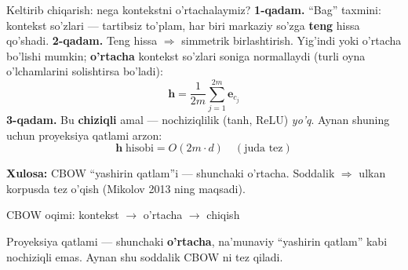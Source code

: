 \documentclass[aspectratio=169,11pt]{beamer}
\begin{document}
\begin{frame}{Keltirib chiqarish: nega kontekstni o'rtachalaymiz?}
  \textbf{1-qadam.} ``Bag'' taxmini: kontekst so'zlari --- tartibsiz to'plam,
  har biri markaziy so'zga \textbf{teng} hissa qo'shadi.
  \pause
  \textbf{2-qadam.} Teng hissa $\Rightarrow$ simmetrik birlashtirish. Yig'indi
  yoki o'rtacha bo'lishi mumkin; \textbf{o'rtacha} kontekst so'zlari soniga
  normallaydi (turli oyna o'lchamlarini solishtirsa bo'ladi):
  $$ \mathbf{h} = \frac{1}{2m}\sum_{j=1}^{2m} \mathbf{e}_{c_j} $$
  \pause
  \textbf{3-qadam.} Bu \textbf{chiziqli} amal --- nochiziqlilik (tanh,
  ReLU) \emph{yo'q}. Aynan shuning uchun proyeksiya qatlami arzon:
  $$ \mathbf{h} \;\text{hisobi} = O(2m\cdot d) \quad(\text{juda tez}) $$
  \begin{tcolorbox}[okbox,top=2pt,bottom=2pt]
    \small \textbf{Xulosa:} CBOW ``yashirin qatlam''i --- shunchaki o'rtacha.
    Soddalik $\Rightarrow$ ulkan korpusda tez o'qish (Mikolov 2013 ning maqsadi).
  \end{tcolorbox}
\end{frame}

\begin{frame}{CBOW oqimi: kontekst $\to$ o'rtacha $\to$ chiqish}
  \begin{center}
  \end{center}
  \vspace{4pt}
  \begin{tcolorbox}[okbox,top=2pt,bottom=2pt]
    \footnotesize
    Proyeksiya qatlami --- shunchaki \textbf{o'rtacha}, na'munaviy ``yashirin
    qatlam'' kabi nochiziqli emas. Aynan shu soddalik CBOW ni tez qiladi.
  \end{tcolorbox}
\end{frame}
\end{document}
